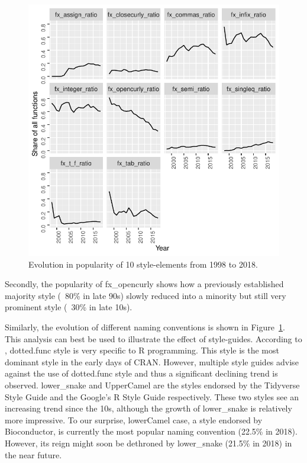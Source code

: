 \begin{figure}[htbp]
  \centering
  \includegraphics{fig1}
  \caption{Evolution in popularity of 10 style-elements from 1998 to 2018.}
  \label{figure:fig1}
\end{figure}


Secondly, the popularity of fx\_opencurly shows how a previously established majority style (~80\% in late 90s) slowly reduced into a minority but still very prominent style (~30\% in late 10s).

Similarly, the evolution of different naming conventions is shown in Figure~\ref{figure:fig1}. This analysis can best be used to illustrate the effect of style-guides. According to \citet{baaaath}, dotted.func style is very specific to R programming. This style is the most dominant style in the early days of CRAN. However, multiple style guides advise against the use of dotted.func style and thus a significant declining trend is observed. lower\_snake and UpperCamel are the styles endorsed by the Tidyverse Style Guide and the Google's R Style Guide respectively. These two styles see an increasing trend since the 10s, although the growth of lower\_snake is relatively more impressive. To our surprise, lowerCamel case, a style endorsed by Bioconductor, is currently the most popular naming convention (22.5\% in 2018). However, its reign might soon be dethroned by lower\_snake (21.5\% in 2018) in the near future.


